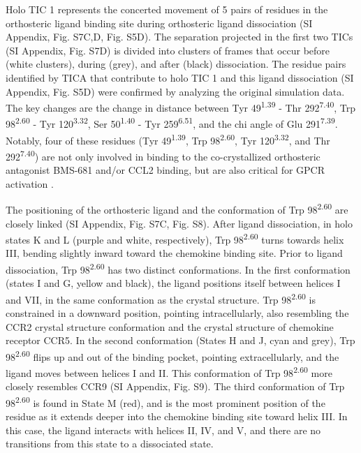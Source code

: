 Holo TIC 1 represents the concerted movement of 5 pairs of residues in the orthosteric ligand binding site during orthosteric ligand dissociation (SI Appendix, Fig. S7C,D, Fig. S5D).
The separation projected in the first two TICs (SI Appendix, Fig. S7D) is divided into clusters of frames that occur before (white clusters), during (grey), and after (black) dissociation.
The residue pairs identified by TICA that contribute to holo TIC 1 and this ligand dissociation (SI Appendix, Fig. S5D) were confirmed by analyzing the original simulation data.
The key changes are the change in distance between Tyr 49\textsuperscript{1.39} - Thr 292\textsuperscript{7.40}, Trp 98\textsuperscript{2.60} - Tyr 120\textsuperscript{3.32}, Ser 50\textsuperscript{1.40} - Tyr 259\textsuperscript{6.51}, and the chi angle of Glu 291\textsuperscript{7.39}.
Notably, four of these residues (Tyr 49\textsuperscript{1.39}, Trp 98\textsuperscript{2.60}, Tyr 120\textsuperscript{3.32}, and Thr 292\textsuperscript{7.40}) are not only involved in binding to the co-crystallized orthosteric antagonist BMS-681 and/or CCL2 binding, but are also critical for GPCR activation \cite{Berkhout2003, Hall2009}.

The positioning of the orthosteric ligand and the conformation of Trp 98\textsuperscript{2.60} are closely linked (SI Appendix, Fig. S7C, Fig. S8).
After ligand dissociation, in holo states K and L (purple and white, respectively), Trp 98\textsuperscript{2.60} turns towards helix III, bending slightly inward toward the chemokine binding site.
Prior to ligand dissociation, Trp 98\textsuperscript{2.60} has two distinct conformations.
In the first conformation (states I and G, yellow and black), the ligand positions itself between helices I and VII, in the same conformation as the crystal structure.
Trp 98\textsuperscript{2.60} is constrained in a downward position, pointing intracellularly, also resembling the CCR2 crystal structure conformation and the crystal structure of chemokine receptor CCR5.
In the second conformation (States H and J, cyan and grey), Trp 98\textsuperscript{2.60} flips up and out of the binding pocket, pointing extracellularly, and the ligand moves between helices I and II.
This conformation of Trp 98\textsuperscript{2.60} more closely resembles CCR9 (SI Appendix, Fig. S9).
The third conformation of Trp 98\textsuperscript{2.60} is found in State M (red), and is the most prominent position of the residue as it extends deeper into the chemokine binding site toward helix III.
In this case, the ligand interacts with helices II, IV, and V, and there are no transitions from this state to a dissociated state.

